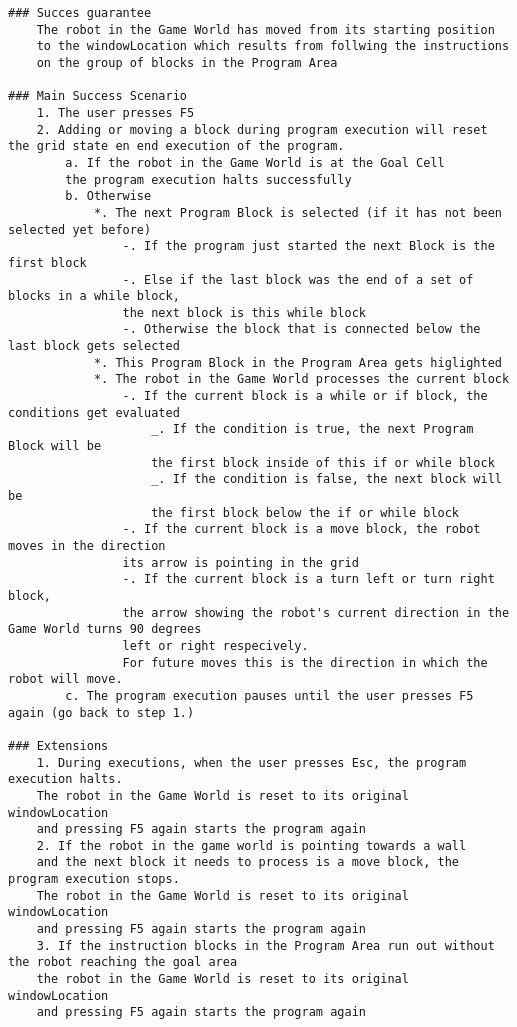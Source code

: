 \documentclass{article}
\begin{document}
\begin{verbatim}
### Succes guarantee
    The robot in the Game World has moved from its starting position 
    to the windowLocation which results from follwing the instructions
    on the group of blocks in the Program Area

### Main Success Scenario
    1. The user presses F5
    2. Adding or moving a block during program execution will reset the grid state en end execution of the program.
        a. If the robot in the Game World is at the Goal Cell
        the program execution halts successfully
        b. Otherwise
            *. The next Program Block is selected (if it has not been selected yet before)
                -. If the program just started the next Block is the first block
                -. Else if the last block was the end of a set of blocks in a while block,
                the next block is this while block
                -. Otherwise the block that is connected below the last block gets selected
            *. This Program Block in the Program Area gets higlighted
            *. The robot in the Game World processes the current block
                -. If the current block is a while or if block, the conditions get evaluated
                    _. If the condition is true, the next Program Block will be 
                    the first block inside of this if or while block
                    _. If the condition is false, the next block will be 
                    the first block below the if or while block
                -. If the current block is a move block, the robot moves in the direction
                its arrow is pointing in the grid
                -. If the current block is a turn left or turn right block, 
                the arrow showing the robot's current direction in the Game World turns 90 degrees
                left or right respecively. 
                For future moves this is the direction in which the robot will move.
        c. The program execution pauses until the user presses F5 again (go back to step 1.)
 
### Extensions
    1. During executions, when the user presses Esc, the program execution halts. 
    The robot in the Game World is reset to its original windowLocation
    and pressing F5 again starts the program again
    2. If the robot in the game world is pointing towards a wall 
    and the next block it needs to process is a move block, the program execution stops. 
    The robot in the Game World is reset to its original windowLocation
    and pressing F5 again starts the program again
    3. If the instruction blocks in the Program Area run out without the robot reaching the goal area
    the robot in the Game World is reset to its original windowLocation
    and pressing F5 again starts the program again


\end{verbatim}
\end{document}
